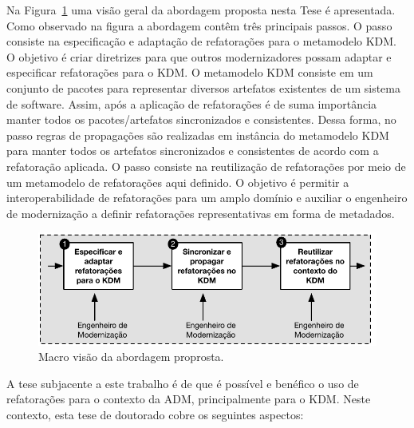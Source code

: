 Na Figura~\ref{fig:abordagem_kdm_tese_processo} uma visão geral da abordagem proposta nesta Tese é apresentada. Como observado na figura a abordagem contêm três principais passos. O passo  consiste na especificação e adaptação de refatorações para o metamodelo KDM. O objetivo é criar diretrizes para que outros modernizadores possam adaptar e especificar refatorações para o KDM. O metamodelo KDM consiste em um conjunto de pacotes para representar diversos artefatos existentes de um sistema de software. Assim, após a aplicação de refatorações é de suma importância manter todos os pacotes/artefatos sincronizados e consistentes. Dessa forma, no passo  regras de propagações são realizadas em instância do metamodelo KDM para manter todos os artefatos sincronizados e consistentes de acordo com a refatoração aplicada. O passo  consiste na reutilização de refatorações por meio de um metamodelo de refatorações aqui definido. O objetivo é permitir a interoperabilidade de refatorações para um amplo domínio e auxiliar o engenheiro de modernização a definir refatorações representativas em forma de metadados.

\begin{figure}[h]
	\centering
	\caption{Macro visão da abordagem proprosta.}
	\label{fig:abordagem_kdm_tese_processo}
	\includegraphics[scale=0.9]{images/AbordagemTESE_kdm_versao1}
	\fautor
\end{figure}


A tese subjacente a este trabalho é de que é possível e benéfico o uso de refatorações para o contexto da ADM, principalmente para o KDM. %
Neste contexto, esta tese de doutorado cobre os seguintes aspectos: 


